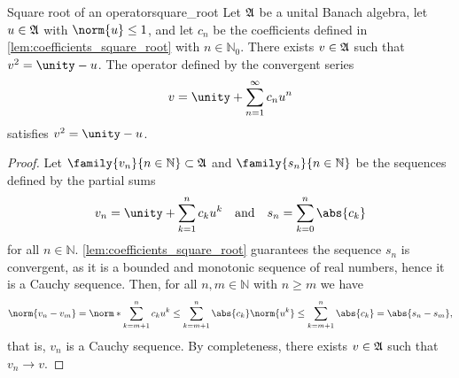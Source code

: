 \begin{theorem}{Square root of an operator}{square_root}
    Let \(\mathfrak{A}\) be a unital Banach algebra, let \(u \in \mathfrak{A}\) with \(\norm{u} \leq 1\), and let \(c_n\) be the coefficients defined in \cref{lem:coefficients_square_root} with \(n \in \mathbb{N}_0\). There exists \(v \in \mathfrak{A}\) such that \(v^2 = \unity - u\). The operator defined by the convergent series
    \begin{equation*}
        v = \unity + \sum_{n = 1}^\infty c_n u^n
    \end{equation*}
    satisfies \(v^2 = \unity - u\).
\end{theorem}
\begin{proof}
    Let \(\family{v_n}{n \in \mathbb{N}}\subset \algebra{A}\) and \(\family{s_n}{n \in \mathbb{N}}\) be the sequences defined by the partial sums
    \begin{equation*}
        v_n = \unity + \sum_{k=1}^n c_k u^k\quad\text{and}\quad s_n = \sum_{k = 0}^n \abs{c_k}
    \end{equation*}
    for all \(n \in \mathbb{N}\). \cref{lem:coefficients_square_root} guarantees the sequence \(s_n\) is convergent, as it is a bounded and monotonic sequence of real numbers, hence it is a Cauchy sequence. Then, for all \(n,m \in \mathbb{N}\) with \(n \geq m\) we have
    \begin{equation*}
        \norm{v_n - v_m} = \norm*{\sum_{k=m+1}^n c_k u^k} \leq \sum_{k = m+1}^n \abs{c_k} \norm{u^k} \leq \sum_{k = m+1}^n \abs{c_k} = \abs{s_n - s_m},
    \end{equation*}
    that is, \(v_n\) is a Cauchy sequence. By completeness, there exists \(v \in \mathfrak{A}\) such that \(v_n \to v\).


\end{proof}
